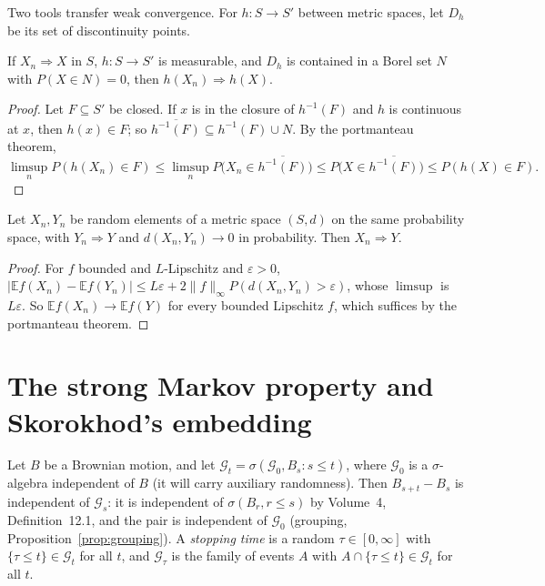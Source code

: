 Two tools transfer weak convergence. For $h:S\to S'$ between metric spaces, let $D_h$ be its set of discontinuity points.

\begin{proposition}\label{prop:contmap}
If $X_n\Rightarrow X$ in $S$, $h:S\to S'$ is measurable, and $D_h$ is contained in a Borel set $N$ with $P(X\in N)=0$, then $h(X_n)\Rightarrow h(X)$.
\end{proposition}
\begin{proof}
Let $F\subseteq S'$ be closed. If $x$ is in the closure of $h^{-1}(F)$ and $h$ is continuous at $x$, then $h(x)\in F$; so $\overline{h^{-1}(F)}\subseteq h^{-1}(F)\cup N$. By
the portmanteau theorem,
\[
\limsup_nP(h(X_n)\in F)\le\limsup_nP\bigl(X_n\in\overline{h^{-1}(F)}\bigr)\le P\bigl(X\in\overline{h^{-1}(F)}\bigr)\le P(h(X)\in F).
\]
\end{proof}

\begin{lemma}\label{lem:together}
Let $X_n,Y_n$ be random elements of a metric space $(S,d)$ on the same probability space, with $Y_n\Rightarrow Y$ and $d(X_n,Y_n)\to0$ in probability. Then
$X_n\Rightarrow Y$.
\end{lemma}
\begin{proof}
For $f$ bounded and $L$-Lipschitz and $\varepsilon>0$, $|\mathbb E f(X_n)-\mathbb E f(Y_n)|\le L\varepsilon+2\|f\|_\infty P(d(X_n,Y_n)>\varepsilon)$, whose $\limsup$ is
$L\varepsilon$. So $\mathbb E f(X_n)\to\mathbb E f(Y)$ for every bounded Lipschitz $f$, which suffices by the portmanteau theorem.
\end{proof}

\section{The strong Markov property and Skorokhod's embedding}

Let $B$ be a Brownian motion, and let $\mathcal G_t=\sigma(\mathcal G_0,B_s:s\le t)$, where $\mathcal G_0$ is a $\sigma$-algebra independent of $B$ (it will carry
auxiliary randomness). Then $B_{s+t}-B_s$ is independent of $\mathcal G_s$: it is independent of $\sigma(B_r,r\le s)$ by Volume~4, Definition~12.1, and the pair is
independent of $\mathcal G_0$ (grouping, Proposition~\ref{prop:grouping}). A \emph{stopping time} is a random $\tau\in[0,\infty]$ with $\{\tau\le t\}\in\mathcal G_t$ for
all $t$, and $\mathcal G_\tau$ is the family of events $A$ with $A\cap\{\tau\le t\}\in\mathcal G_t$ for all $t$.

